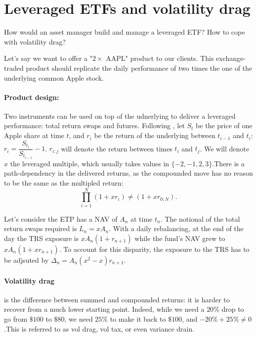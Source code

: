 \section{Leveraged ETFs and volatility drag}

\begin{tcolorbox}[width=\linewidth, sharp corners=all, colback=white!95!black]
How would an asset manager build and manage a leveraged ETF? How to cope with volatility drag?
\end{tcolorbox}

Let's say we want to offer a "$2\times$ AAPL" product to our clients. This exchange-traded product should replicate the daily performance of two times the one of the underlying common Apple stock.

\paragraph*{Product design:} Two instruments can be used on top of the udnerlying to deliver a leveraged performance: total return swaps and futures. Following \cite{cheng2009dynamics}, let $S_t$ be the price of one Apple share at time $t$, and $r_i$ be the return of the underlying between $t_{i-1}$ and $t_i$: $r_i = \dfrac{S_{t_{i}}}{S_{t_{i-1}}} - 1$. $r_{i\colon j}$ will denote the return between times $t_i$ and $t_j$. We will denote $x$ the leveraged multiple, which usually takes values in $\{-2, -1, 2, 3\}$.\newline There is a path-dependency in the delivered returns, as the compounded move has no reason to be the same as the multipled return: \[\prod_{i=1}^N (1+xr_i) \neq (1+xr_{0\colon N}).\]

Let's consider the ETP has a NAV of $A_n$ at time $t_n$. The notional of the total return swaps required is $L_n = x A_n$. With a daily rebalancing, at the end of the day the TRS exposure is $x A_n (1+r_{n+1})$ while the fund's NAV grew to $x A_n (1+xr_{n+1})$. To account for this disparity, the exposure to the TRS has to be adjsuted by $\Delta_n = A_n (x^2-x) r_{n+1}$.

\paragraph*{Volatility drag} is the difference between summed and compounded returns: it is harder to recover from a much lower starting point. Indeed, while we need a $20\%$ drop to go from $\$100$ to $\$80$, we need $25\%$ to make it back to $\$100$, and $-20\%+25\% \neq 0$.\newline This is referred to as vol drag, vol tax, or even variance drain.

